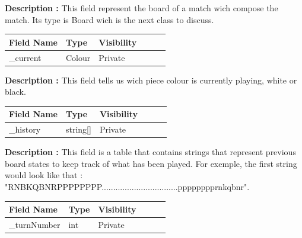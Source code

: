\documentclass[12pt]{article}
\begin{document}
\textbf{Description :} This field represent the board of a match wich compose
the match. Its type is Board wich is the next class to discuss.

\begin{table}[H]
    \begin{tabular}{llllll}
    \hline
    \multicolumn{1}{|l|}{\cellcolor[HTML]{EFEFEF}\textbf{Field Name}} & \multicolumn{1}{l|}{\cellcolor[HTML]{EFEFEF}\textbf{Type}} & \multicolumn{1}{l|}{\cellcolor[HTML]{EFEFEF}\textbf{Visibility}} \\ \hline
    \multicolumn{1}{|l|}{\_current}                                     & \multicolumn{1}{l|}{Colour}                                 & \multicolumn{1}{l|}{Private}                                     \\ \hline
    \end{tabular}
\end{table}

\textbf{Description :} This field tells us wich piece colour is
currently playing, white or black.

\begin{table}[H]
    \begin{tabular}{llllll}
    \hline
    \multicolumn{1}{|l|}{\cellcolor[HTML]{EFEFEF}\textbf{Field Name}} & \multicolumn{1}{l|}{\cellcolor[HTML]{EFEFEF}\textbf{Type}} & \multicolumn{1}{l|}{\cellcolor[HTML]{EFEFEF}\textbf{Visibility}} \\ \hline
    \multicolumn{1}{|l|}{\_history}                                     & \multicolumn{1}{l|}{string[]}                            & \multicolumn{1}{l|}{Private}                                     \\ \hline
    \end{tabular}
\end{table}

\textbf{Description :} This field is a table that contains strings that
represent previous board states to keep track of what has been played. For exemple,
the first string would look like that :
\\"RNBKQBNRPPPPPPPP.................................pppppppprnkqbnr". 

\begin{table}[H]
    \begin{tabular}{llllll}
    \hline
    \multicolumn{1}{|l|}{\cellcolor[HTML]{EFEFEF}\textbf{Field Name}} & \multicolumn{1}{l|}{\cellcolor[HTML]{EFEFEF}\textbf{Type}} & \multicolumn{1}{l|}{\cellcolor[HTML]{EFEFEF}\textbf{Visibility}} \\ \hline
    \multicolumn{1}{|l|}{\_turnNumber}                                & \multicolumn{1}{l|}{int}                                   & \multicolumn{1}{l|}{Private}                                     \\ \hline
    \end{tabular}
\end{table}
\end{document}
